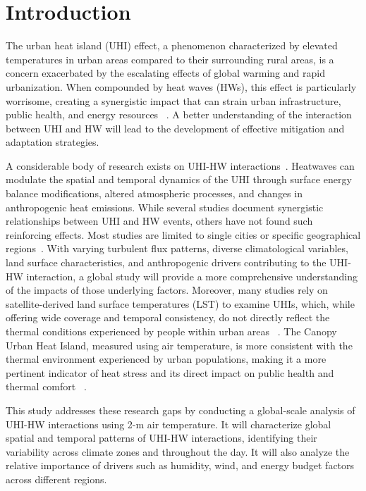 \section*{Introduction}
The urban heat island (UHI) effect, a phenomenon characterized by elevated temperatures in urban areas compared to their surrounding rural areas, is a concern exacerbated by the escalating effects of global warming and rapid urbanization. When compounded by heat waves (HWs), this effect is particularly worrisome, creating a synergistic impact that can strain urban infrastructure, public health, and energy resources\unskip~\cite{2755510:33598912,2755510:33598911} . A better understanding of the interaction between UHI and HW will lead to the development of effective mitigation and adaptation strategies.

A considerable body of research exists on UHI-HW interactions\unskip~\cite{2755510:33598930}. Heatwaves can modulate the spatial and temporal dynamics of the UHI through surface energy balance modifications, altered atmospheric processes, and changes in anthropogenic heat emissions. While several studies document synergistic relationships between UHI and HW events, others have not found such reinforcing effects. Most studies are limited to single cities or specific geographical regions\unskip~\cite{2755510:33598950,2755510:33598949,2755510:33598945,2755510:33598943,2755510:33598941,2755510:33598938,2755510:33598937,2755510:33598935}. With varying turbulent flux patterns, diverse climatological variables, land surface characteristics, and anthropogenic drivers contributing to the UHI-HW interaction, a global study will provide a more comprehensive understanding of the impacts of those underlying factors. Moreover, many studies rely on satellite-derived land surface temperatures (LST) to examine UHIs, which, while offering wide coverage and temporal consistency, do not directly reflect the thermal conditions experienced by people within urban areas\unskip~\cite{2755510:33598945,2755510:33598947} . The Canopy Urban Heat Island, measured using air temperature, is more consistent with the thermal environment experienced by urban populations, making it a more pertinent indicator of heat stress and its direct impact on public health and thermal comfort\unskip~\cite{2755510:33598934} .

This study addresses these research gaps by conducting a global-scale analysis of UHI-HW interactions using 2-m air temperature. It will characterize global spatial and temporal patterns of UHI-HW interactions, identifying their variability across climate zones and throughout the day. It will also analyze the relative importance of drivers such as humidity, wind, and energy budget factors across different regions. 